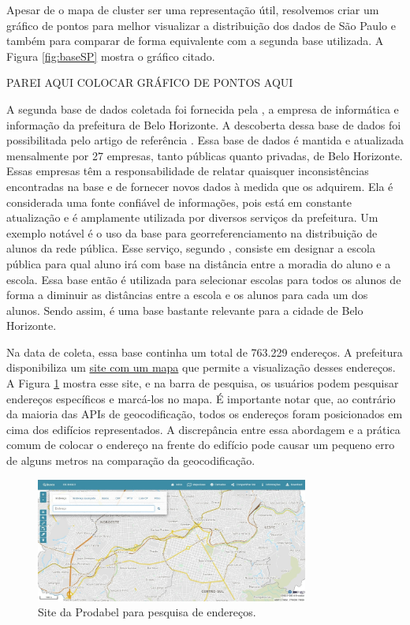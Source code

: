 Apesar de o mapa de cluster ser uma representação útil, resolvemos criar um gráfico de pontos para melhor visualizar a distribuição dos dados de São Paulo e também para comparar de forma equivalente com a segunda base utilizada. A Figura \ref{fig:baseSP} mostra o gráfico citado.


PAREI AQUI
COLOCAR GRÁFICO DE PONTOS AQUI 



A segunda base de dados coletada foi fornecida pela \cite{Prodabel}, a empresa de informática e informação da prefeitura de Belo Horizonte. A descoberta dessa base de dados foi possibilitada pelo artigo de referência \cite{Clodoveu2011}. Essa base de dados é mantida e atualizada mensalmente por 27 empresas, tanto públicas quanto privadas, de Belo Horizonte. Essas empresas têm a responsabilidade de relatar quaisquer inconsistências encontradas na base e de fornecer novos dados à medida que os adquirem. Ela é considerada uma fonte confiável de informações, pois está em constante atualização e é amplamente utilizada por diversos serviços da prefeitura. Um exemplo notável é o uso da base para georreferenciamento na distribuição de alunos da rede pública. Esse serviço, segundo \cite{Clodoveu2011}, consiste em designar a escola pública para qual aluno irá com base na distância entre a moradia do aluno e a escola. Essa base então é utilizada para selecionar escolas para todos os alunos de forma a diminuir as distâncias entre a escola e os alunos para cada um dos alunos. Sendo assim, é uma base bastante relevante para a cidade de Belo Horizonte.

Na data de coleta, essa base continha um total de 763.229 endereços. A prefeitura disponibiliza um \href{https://bhmap.pbh.gov.br}{site com um mapa} que permite a visualização desses endereços. A Figura \ref{fig:siteProdabel} mostra esse site, e na barra de pesquisa, os usuários podem pesquisar endereços específicos e marcá-los no mapa. É importante notar que, ao contrário da maioria das APIs de geocodificação, todos os endereços foram posicionados em cima dos edifícios representados. A discrepância entre essa abordagem e a prática comum de colocar o endereço na frente do edifício pode causar um pequeno erro de alguns metros na comparação da geocodificação.

\begin{figure}
    \centering
    \includegraphics[width=0.8\textwidth]{Figuras/siteProdabel.jpeg}
    \caption{Site da Prodabel para pesquisa de endereços. }
    \label{fig:siteProdabel}
\end{figure}

